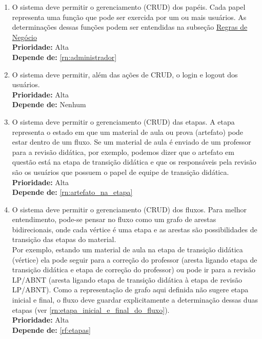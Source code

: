 \begin{enumerate}[label=\textbf{RF\protect\twodigits{\theenumi}}, leftmargin=2cm]

	\item \label{rf:papeis} O sistema deve permitir o gerenciamento (CRUD) dos papéis. Cada papel representa uma função que pode ser exercida por um ou mais usuários. As determinações dessas funções podem ser entendidas na subseção \hyperref[subsec:regras_de_negocio]{Regras de Negócio} \\
		\textbf{Prioridade:} Alta \\
		\textbf{Depende de:} \hyperref[rn:administrador]{\ref{rn:administrador}}

	\item \label{rf:usuarios} O sistema deve permitir, além das ações de CRUD, o login e logout dos usuários. \\
		\textbf{Prioridade:} Alta \\
		\textbf{Depende de:} Nenhum

	\item \label{rf:etapas} O sistema deve permitir o gerenciamento (CRUD) das etapas. A etapa representa o estado em que um material de aula ou prova (artefato) pode estar dentro de um fluxo. Se um material de aula é enviado de um professor para a revisão didática, por exemplo, podemos dizer que o artefato em questão está na etapa de transição didática e que os responsáveis pela revisão são os usuários que possuem o papel de equipe de transição didática.  \\
		\textbf{Prioridade:} Alta \\
		\textbf{Depende de:} \hyperref[rn:artefato_na_etapa]{\ref{rn:artefato_na_etapa}}

	\item \label{rf:fluxos} O sistema deve permitir o gerenciamento (CRUD) dos fluxos. Para melhor entendimento, pode-se pensar no fluxo como um grafo de arestas bidirecionais, onde cada vértice é uma etapa e as arestas são possibilidades de transição das etapas do material. \\ 
	Por exemplo, estando um material de aula na etapa de transição didática (vértice) ela pode seguir para a correção do professor (aresta ligando etapa de transição didática e etapa de correção do professor) ou pode ir para a revisão LP/ABNT (aresta ligando etapa de transição didática à etapa de revisão LP/ABNT). Como a representação de grafo aqui definida não sugere etapa inicial e final, o fluxo deve guardar explicitamente a determinação dessas duas etapas (ver \hyperref[rn:etapa_inicial_e_final_do_fluxo]{\ref{rn:etapa_inicial_e_final_do_fluxo}}). \\
		\textbf{Prioridade:} Alta \\
		\textbf{Depende de:} \hyperref[rf:etapas]{\ref{rf:etapas}}


\end{enumerate}

